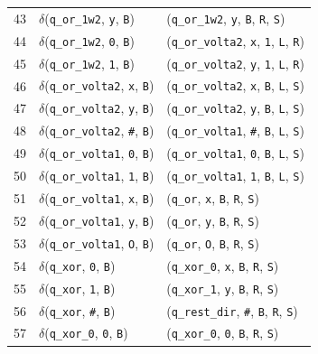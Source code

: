 \documentclass[report, 12pt]{uftreport}
\begin{document}
{\begin{longtable}{r l l}
43 & $\delta$(\texttt{q\_or\_1w2}, \texttt{y}, \texttt{B}) & (\texttt{q\_or\_1w2}, \texttt{y}, \texttt{B}, \texttt{R}, \texttt{S}) \\
44 & $\delta$(\texttt{q\_or\_1w2}, \texttt{0}, \texttt{B}) & (\texttt{q\_or\_volta2}, \texttt{x}, \texttt{1}, \texttt{L}, \texttt{R}) \\
45 & $\delta$(\texttt{q\_or\_1w2}, \texttt{1}, \texttt{B}) & (\texttt{q\_or\_volta2}, \texttt{y}, \texttt{1}, \texttt{L}, \texttt{R}) \\
\midrule
46 & $\delta$(\texttt{q\_or\_volta2}, \texttt{x}, \texttt{B}) & (\texttt{q\_or\_volta2}, \texttt{x}, \texttt{B}, \texttt{L}, \texttt{S}) \\
47 & $\delta$(\texttt{q\_or\_volta2}, \texttt{y}, \texttt{B}) & (\texttt{q\_or\_volta2}, \texttt{y}, \texttt{B}, \texttt{L}, \texttt{S}) \\
48 & $\delta$(\texttt{q\_or\_volta2}, \texttt{\#}, \texttt{B}) & (\texttt{q\_or\_volta1}, \texttt{\#}, \texttt{B}, \texttt{L}, \texttt{S}) \\
\midrule
49 & $\delta$(\texttt{q\_or\_volta1}, \texttt{0}, \texttt{B}) & (\texttt{q\_or\_volta1}, \texttt{0}, \texttt{B}, \texttt{L}, \texttt{S}) \\
50 & $\delta$(\texttt{q\_or\_volta1}, \texttt{1}, \texttt{B}) & (\texttt{q\_or\_volta1}, \texttt{1}, \texttt{B}, \texttt{L}, \texttt{S}) \\
51 & $\delta$(\texttt{q\_or\_volta1}, \texttt{x}, \texttt{B}) & (\texttt{q\_or}, \texttt{x}, \texttt{B}, \texttt{R}, \texttt{S}) \\
52 & $\delta$(\texttt{q\_or\_volta1}, \texttt{y}, \texttt{B}) & (\texttt{q\_or}, \texttt{y}, \texttt{B}, \texttt{R}, \texttt{S}) \\
53 & $\delta$(\texttt{q\_or\_volta1}, \texttt{O}, \texttt{B}) & (\texttt{q\_or}, \texttt{O}, \texttt{B}, \texttt{R}, \texttt{S}) \\
\midrule
54 & $\delta$(\texttt{q\_xor}, \texttt{0}, \texttt{B}) & (\texttt{q\_xor\_0}, \texttt{x}, \texttt{B}, \texttt{R}, \texttt{S}) \\
55 & $\delta$(\texttt{q\_xor}, \texttt{1}, \texttt{B}) & (\texttt{q\_xor\_1}, \texttt{y}, \texttt{B}, \texttt{R}, \texttt{S}) \\
56 & $\delta$(\texttt{q\_xor}, \texttt{\#}, \texttt{B}) & (\texttt{q\_rest\_dir}, \texttt{\#}, \texttt{B}, \texttt{R}, \texttt{S}) \\
\midrule
57 & $\delta$(\texttt{q\_xor\_0}, \texttt{0}, \texttt{B}) & (\texttt{q\_xor\_0}, \texttt{0}, \texttt{B}, \texttt{R}, \texttt{S}) \\

\end{longtable}}
\end{document}
